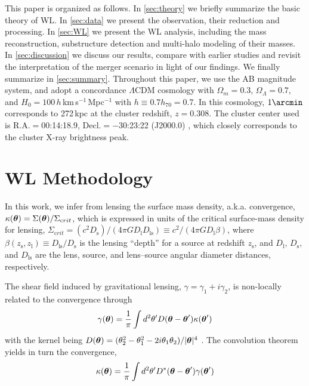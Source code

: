 \documentclass[iop,twocolumn]{emulateapj}
\def\btheta{\mbox{\boldmath $\theta$}}
\def\dlsds{\mbox{$D_\mathrm{ls}/D_\mathrm{s}$}}
\begin{document}
This paper is organized as follows.   In \autoref{sec:theory} we briefly summarize the basic theory of WL. In \autoref{sec:data} we present the observation, their reduction and processing. In \autoref{sec:WL} we present the WL analysis, including the mass reconstruction, substructure detection and multi-halo modeling of their masses.  In \autoref{sec:discussion} we discuss our results, compare with earlier studies and  revisit the interpretation of the merger scenario in light of our findings. We finally summarize in \autoref{sec:summary}.
%
Throughout this paper, we use the AB magnitude system,
and adopt a concordance $\Lambda$CDM cosmology with $\Omega_m =0.3$,
$\Omega_\Lambda =0.7$, and $H_0 =100\,h$\,km\,s$^{-1}$\,Mpc$^{-1}$ with $h\equiv0.7h_{70}=0.7$. In
this cosmology, $1\arcmin$ corresponds to 272\,kpc at
the cluster redshift, $z = 0.308$. 
The cluster center used is
R.A.$=$00:14:18.9, Decl.$=-$30:23:22 (J2000.0) \citep{Ebeling10}, which closely corresponds to the cluster X-ray brightness peak.



\section{WL Methodology}
\label{sec:theory}

In this work, we infer from lensing the surface mass density, a.k.a. convergence, $\kappa(\btheta) =
\Sigma(\btheta)/\Sigma_{\mathrm crit}$, which is expressed in units
of the critical surface-mass density for lensing,  $\Sigma_{\mathrm crit}  =
(c^2 D_\mathrm{s})/(4\pi G D_\mathrm{l}D_\mathrm{ls})
\equiv c^2/(4\pi G D_\mathrm{l}\beta)$,
where $\beta(z_\mathrm{s},z_\mathrm{l}) \equiv \dlsds$ is the lensing
``depth'' for a source at redshift $z_\mathrm{s}$, 
and $D_\mathrm{l},\,D_\mathrm{s},$ and $D_\mathrm{ls}$ are the lens, source, and lens--source 
angular diameter distances, respectively. 

The shear field induced by gravitational lensing,
$\gamma=\gamma_1+i\gamma_2$, is non-locally related to the convergence
through 
\begin{equation}
 \gamma(\btheta) =  \frac{1}{\pi}\int d^2\theta' D(\btheta-\btheta') \kappa(\btheta')
\end{equation}
with the kernel being $D(\btheta) = (\theta_2^2-\theta_1^2-2i\theta_1\theta_2)/|\btheta|^4$ \citep{KaiserSquires93}. The convolution theorem yields in turn the convergence,
\begin{equation}
\label{eq:KS93}
 \kappa(\btheta) = \frac{1}{\pi} \int d^2\theta' D^*(\btheta-\btheta') \gamma(\btheta')
\end{equation}
\end{document}
